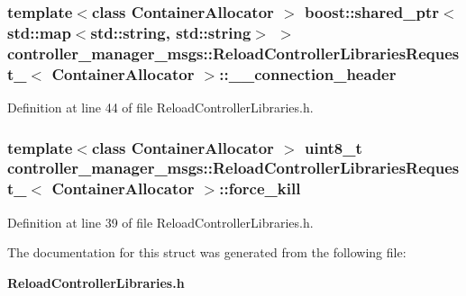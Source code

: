 \subsubsection[{\-\_\-\-\_\-connection\-\_\-header}]{\setlength{\rightskip}{0pt plus 5cm}template$<$class Container\-Allocator $>$ boost\-::shared\-\_\-ptr$<$std\-::map$<$std\-::string, std\-::string$>$ $>$ {\bf controller\-\_\-manager\-\_\-msgs\-::\-Reload\-Controller\-Libraries\-Request\-\_\-}$<$ \-Container\-Allocator $>$\-::{\bf \-\_\-\-\_\-connection\-\_\-header}}\label{structcontroller__manager__msgs_1_1ReloadControllerLibrariesRequest___a6d0ec48e14fd4f484048175c34b70869}


\-Definition at line 44 of file \-Reload\-Controller\-Libraries.\-h.

\subsubsection[{force\-\_\-kill}]{\setlength{\rightskip}{0pt plus 5cm}template$<$class Container\-Allocator $>$ uint8\-\_\-t {\bf controller\-\_\-manager\-\_\-msgs\-::\-Reload\-Controller\-Libraries\-Request\-\_\-}$<$ \-Container\-Allocator $>$\-::{\bf force\-\_\-kill}}\label{structcontroller__manager__msgs_1_1ReloadControllerLibrariesRequest___a38e6d37a8398d091104391723e557e3f}


\-Definition at line 39 of file \-Reload\-Controller\-Libraries.\-h.



\-The documentation for this struct was generated from the following file\-:\begin{DoxyCompactItemize}
\item 
{\bf \-Reload\-Controller\-Libraries.\-h}\end{DoxyCompactItemize}
